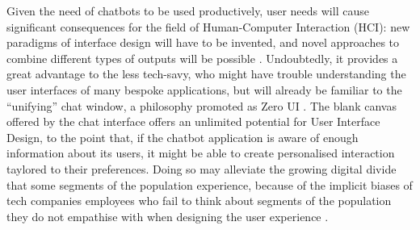 Given the need of chatbots to be used productively, user needs will cause significant consequences for the field of Human-Computer Interaction (HCI): new paradigms of interface design will have to be invented, and novel approaches to combine different types of outputs will be possible \cite{Følstad2017}. Undoubtedly, it provides a great advantage to the less tech-savy, who might have trouble understanding the user interfaces of many bespoke applications, but will already be familiar to the ``unifying'' chat window, a philosophy promoted as Zero UI \cite{zeroui}. The blank canvas offered by the chat interface offers an unlimited potential for User Interface Design, to the point that, if the chatbot application is aware of enough information about its users, it might be able to create personalised interaction taylored to their preferences. Doing so may alleviate the growing digital divide that some segments of the population experience, because of the implicit biases of tech companies employees who fail to think about segments of the population they do not empathise with when designing the user experience \cite{Brandtzaeg2011}.

